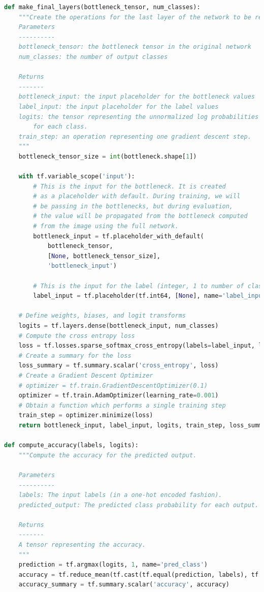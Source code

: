 \documentclass[hyperref]{article}
\theoremstyle{nonumberplain}
\begin{document}
\begin{appendices}
\begin{lstlisting}[language=Python]
def make_final_layers(bottleneck_tensor, num_classes):
    """Create the operations for the last layer of the network to be retrained.
    Parameters
    ----------
    bottleneck_tensor: the bottleneck tensor in the original network
    num_classes: the number of output classes

    Returns
    -------
    bottleneck_input: the input placeholder for the bottleneck values
    label_input: the input placeholder for the label values
    logits: the tensor representing the unnormalized log probabilities
        for each class.
    train_step: an operation representing one gradient descent step.
    """
    bottleneck_tensor_size = int(bottleneck.shape[1])

    with tf.variable_scope('input'):
        # This is the input for the bottleneck. It is created
        # as a placeholder with default. During training, we will
        # be passing in the bottlenecks, but during evaluation,
        # the value will be propagated from the bottleneck computed
        # from the image using the full network.
        bottleneck_input = tf.placeholder_with_default(
            bottleneck_tensor,
            [None, bottleneck_tensor_size],
            'bottleneck_input')

        # This is the input for the label (integer, 1 to number of classes)
        label_input = tf.placeholder(tf.int64, [None], name='label_input')

    # Define weights, biases, and logit transforms
    logits = tf.layers.dense(bottleneck_input, num_classes)
    # Compute the cross entropy loss
    loss = tf.losses.sparse_softmax_cross_entropy(labels=label_input, logits=logits)
    # Create a summary for the loss
    loss_summary = tf.summary.scalar('cross_entropy', loss)
    # Create a Gradient Descent Optimizer
    # optimizer = tf.train.GradientDescentOptimizer(0.1)
    optimizer = tf.train.AdamOptimizer(learning_rate=0.001)
    # Obtain a function which performs a single training step
    train_step = optimizer.minimize(loss)
    return bottleneck_input, label_input, logits, train_step, loss_summary

def compute_accuracy(labels, logits):
    """Compute the accuracy for the predicted output.

    Parameters
    ----------
    labels: The input labels (in a one-hot encoded fashion).
    predicted_output: The predicted class probability for each output.

    Returns
    -------
    A tensor representing the accuracy.
    """
    prediction = tf.argmax(logits, 1, name='pred_class')
    accuracy = tf.reduce_mean(tf.cast(tf.equal(prediction, labels), tf.float32))
    accuracy_summary = tf.summary.scalar('accuracy', accuracy)


\end{lstlisting}
\end{appendices}
\end{document}

